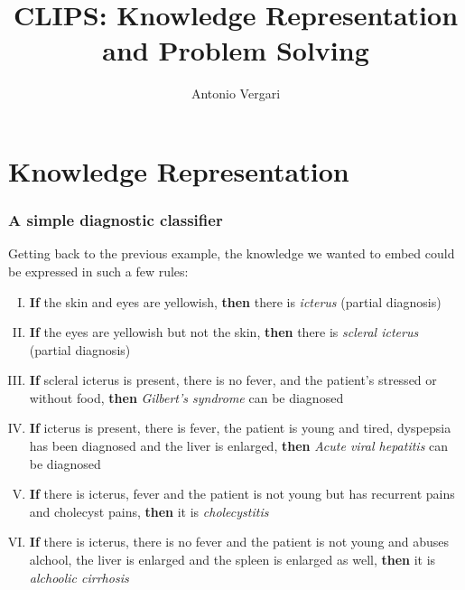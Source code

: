\documentclass[xcolor={usenames,dvipsnames,svgnames}, compress]{beamer}
\begin{document}
\title{CLIPS: Knowledge Representation and Problem Solving}
\author{Antonio Vergari}

\footnotesize \let\small\footnotesize





{
  \begin{frame}
    \titlepage
  \end{frame}
}

\section{Knowledge Representation}
{
  \begin{frame}
    \sectionpage
  \end{frame}
}

\begin{frame}
  \frametitle{A simple diagnostic classifier}
  Getting back to the previous example, the knowledge we wanted to
  embed could be expressed in such a few rules:
  \begin{enumerate}[I.]
  \item \textbf{If} the skin and eyes are yellowish, \textbf{then}
    there is \emph{icterus} (partial diagnosis)
  \item  \textbf{If} the eyes are yellowish but not the skin, \textbf{then} there is
    \emph{scleral icterus} (partial diagnosis)
  \item \textbf{If} scleral icterus is present, there is no fever, and the
    patient's stressed or without food, \textbf{then} \emph{Gilbert's syndrome} can be
    diagnosed
  \item  \textbf{If} icterus is present, there is fever, the patient is young
    and tired, dyspepsia has been diagnosed and the liver is enlarged,
    \textbf{then} \emph{Acute viral hepatitis} can be diagnosed
  \item  \textbf{If} there is icterus, fever and the patient is not young but
    has recurrent pains and cholecyst pains, \textbf{then} it is  \emph{cholecystitis}
  \item \textbf{If} there is icterus, there is no fever and the patient is not
    young and abuses alchool, the liver is enlarged and the spleen is
    enlarged as well, \textbf{then} it is \emph{alchoolic cirrhosis}
  \end{enumerate}

\end{frame}
\end{document}
